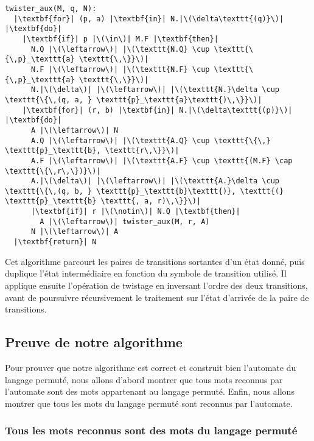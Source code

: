 \newpage
\begin{verbatim}
twister_aux(M, q, N):
  |\textbf{for}| (p, a) |\textbf{in}| N.|\(\delta\texttt{(q)}\)| |\textbf{do}|
    |\textbf{if}| p |\(\in\)| M.F |\textbf{then}|
      N.Q |\(\leftarrow\)| |\(\texttt{N.Q} \cup \texttt{\{\,p}_\texttt{a} \texttt{\,\}}\)|
      N.F |\(\leftarrow\)| |\(\texttt{N.F} \cup \texttt{\{\,p}_\texttt{a} \texttt{\,\}}\)|
      N.|\(\delta\)| |\(\leftarrow\)| |\(\texttt{N.}\delta \cup \texttt{\{\,(q, a, } \texttt{p}_\texttt{a}\texttt{)\,\}}\)|
    |\textbf{for}| (r, b) |\textbf{in}| N.|\(\delta\texttt{(p)}\)| |\textbf{do}|
      A |\(\leftarrow\)| N
      A.Q |\(\leftarrow\)| |\(\texttt{A.Q} \cup \texttt{\{\,} \texttt{p}_\texttt{b}, \texttt{r\,\}}\)|
      A.F |\(\leftarrow\)| |\(\texttt{A.F} \cup \texttt{(M.F} \cap \texttt{\{\,r\,\})}\)|
      A.|\(\delta\)| |\(\leftarrow\)| |\(\texttt{A.}\delta \cup \texttt{\{\,(q, b, } \texttt{p}_\texttt{b}\texttt{)}, \texttt{(} \texttt{p}_\texttt{b} \texttt{, a, r)\,\}}\)|
      |\textbf{if}| r |\(\notin\)| N.Q |\textbf{then}|
        A |\(\leftarrow\)| twister_aux(M, r, A)
      N |\(\leftarrow\)| A
  |\textbf{return}| N
\end{verbatim}

\begin{remark}
  Cet algorithme parcourt les paires de transitions sortantes d’un état donné,
  puis duplique l’état intermédiaire en fonction du symbole de transition
  utilisé. Il applique ensuite l’opération de twistage en inversant l’ordre
  des deux transitions, avant de poursuivre récursivement le traitement sur
  l'état d’arrivée de la paire de transitions.
\end{remark}

\subsection{Preuve de notre algorithme}

Pour prouver que notre algorithme est correct et construit bien l'automate
du langage permuté, nous allons d'abord montrer que tous mots reconnus
par l'automate sont des mots appartenant au langage permuté. Enfin, nous
allons montrer que tous les mots du langage permuté sont reconnus par 
l'automate.

\subsubsection{Tous les mots reconnus sont des mots du langage permut\'e}

